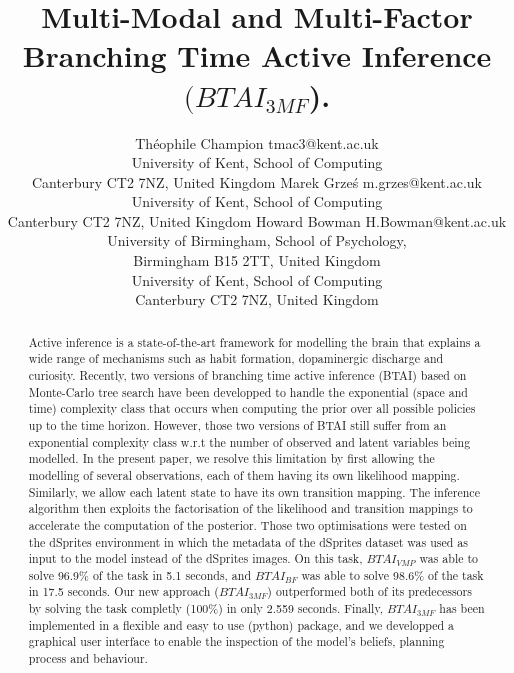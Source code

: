 \documentclass[twoside,11pt]{article}
\begin{document}
\title{Multi-Modal and Multi-Factor Branching Time Active Inference $(BTAI_{3MF}$).}

\author{\name Théophile Champion \email tmac3@kent.ac.uk \\
       \addr University of Kent, School of Computing\\
       Canterbury CT2 7NZ, United Kingdom
       \AND
       \name Marek Grze\'s \email m.grzes@kent.ac.uk \\
       \addr University of Kent, School of Computing\\
       Canterbury CT2 7NZ, United Kingdom
       \AND
       \name Howard Bowman \email H.Bowman@kent.ac.uk \\
       \addr University of Birmingham, School of Psychology,\\
       Birmingham B15 2TT, United Kingdom\\
       University of Kent, School of Computing\\
       Canterbury CT2 7NZ, United Kingdom
       }
       

\maketitle

\begin{abstract}%
Active inference is a state-of-the-art framework for modelling the brain that explains a wide range of mechanisms such as habit formation, dopaminergic discharge and curiosity. Recently, two versions of branching time active inference (BTAI) based on Monte-Carlo tree search have been developped to handle the exponential (space and time) complexity class that occurs when computing the prior over all possible policies up to the time horizon. However, those two versions of BTAI still suffer from an exponential complexity class w.r.t the number of observed and latent variables being modelled. In the present paper, we resolve this limitation by first allowing the modelling of several observations, each of them having its own likelihood mapping. Similarly, we allow each latent state to have its own transition mapping. The inference algorithm then exploits the factorisation of the likelihood and transition mappings to accelerate the computation of the posterior. Those two optimisations were tested on the dSprites environment in which the metadata of the dSprites dataset was used as input to the model instead of the dSprites images. On this task, $BTAI_{VMP}$ \citep{AITS_THEORY, AITS_PRACTICE} was able to solve 96.9\% of the task in 5.1 seconds, and $BTAI_{BF}$ \citep{BTAI_BF} was able to solve 98.6\% of the task in 17.5 seconds. Our new approach ($BTAI_{3MF}$) outperformed both of its predecessors by solving the task completly (100\%) in only 2.559 seconds. Finally, $BTAI_{3MF}$ has been implemented in a flexible and easy to use (python) package, and we developped a graphical user interface to enable the inspection of the model's beliefs, planning process and behaviour.
\end{abstract}
\end{document}

